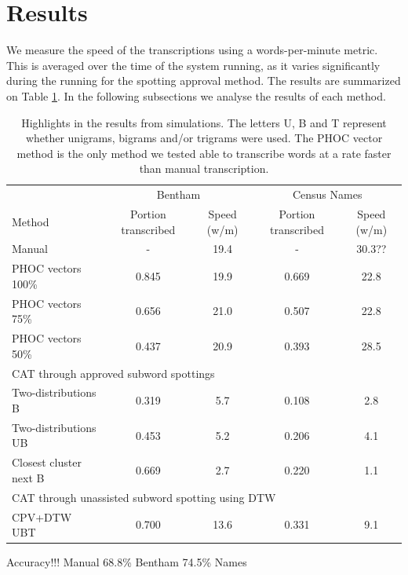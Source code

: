 \documentclass[ms,electronic,twosidetoc,letterpaper,chaptercenter,parttop,lol,lof,lot]{byumsphd}
\begin{document}
\section{Results}

We measure the speed of the transcriptions using a words-per-minute metric. This is averaged over the time of the system running, as it varies significantly during the running for the spotting approval method. The results are summarized on Table \ref{tab:finalresults}. In the following subsections we analyse the results of each method.

\begin{table}
\centering
\begin{tabular}{| l | c  c | c c |}
  \hline
   & \multicolumn{2}{c|}{Bentham} & \multicolumn{2}{c|}{Census Names}\\
  Method & Portion transcribed & Speed (w/m) & Portion transcribed & Speed (w/m)\\
  \hline		

  Manual             & -   & 19.4 &  -   & 30.3?? \\
  PHOC vectors 100\% & 0.845 & 19.9 &  0.669 & 22.8 \\
  PHOC vectors 75\%  & 0.656 & 21.0 &  0.507 & 22.8 \\
  PHOC vectors 50\%  & 0.437 & 20.9 &  0.393 & 28.5 \\
  \hline	
  \multicolumn{5}{|l|}{CAT through approved subword spottings} \\
  Two-distributions B & 0.319 & 5.7 & 0.108 & 2.8 \\
  Two-distributions UB & 0.453 & 5.2 & 0.206 & 4.1 \\
  Closest cluster next B & 0.669 & 2.7 & 0.220 & 1.1 \\
  \hline	
  \multicolumn{5}{|l|}{CAT through unassisted subword spotting using DTW} \\
  CPV+DTW UBT & 0.700 & 13.6 & 0.331 & 9.1 \\
  
  \hline  
\end{tabular}
\caption{Highlights in the results from simulations. The letters U, B and T represent whether unigrams, bigrams and/or trigrams were used. The PHOC vector method is the only method we tested able to transcribe words at a rate faster than manual transcription.}
\label{tab:finalresults}
\end{table}

Accuracy!!!
Manual
68.8\% Bentham
74.5\% Names
\end{document}
